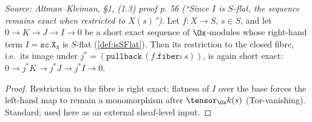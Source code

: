 \begin{theorem}
  \label{thm:ega_flat_fibre_restriction}
  \textit{Source: Altman--Kleiman, §1, (1.3) proof p. 56 (``Since $I$ is $S$-flat,
  the sequence remains exact when restricted to $X(s)$'').}
  Let $f : X \to S$, $s \in S$, and let
  $0 \to K \to J \to I \to 0$ be a short exact sequence of $\Ox$-modules whose
  right-hand term $I = \mathtt{sc.X_3}$ is $S$-flat (\cref{def:isSFlat}). Then its
  restriction to the closed fibre, i.e.\ its image under
  $j^* = (\mathtt{pullback}\,(f.\mathtt{fiber}\iota\,s))$, is again short exact:
  $0 \to j^*K \to j^*J \to j^*I \to 0$.
  \begin{proof}
    Restriction to the fibre is right exact; flatness of $I$ over the base forces
    the left-hand map to remain a monomorphism after $\tensor_{\Os} k(s)$
    (Tor-vanishing). Standard; used here as an external sheaf-level input.
  \end{proof}
\end{theorem}

